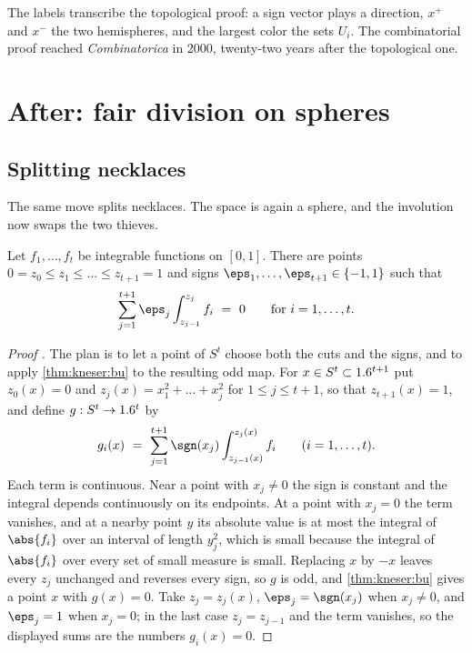 \begin{refsection}
The labels transcribe the topological proof: a sign vector plays a direction, $x^+$ and $x^-$ the two hemispheres, and the largest color the sets $U_i$. The combinatorial proof reached \emph{Combinatorica} in 2000, twenty-two years after the topological one.

\section{After: fair division on spheres}\label{sec:kneser:after2}

\subsection{Splitting necklaces}

The same move splits necklaces. The space is again a sphere, and the involution now swaps the two thieves.

\begin{theorem}\label{thm:kneser:hobbyrice}
Let $f_1,\dots,f_t$ be integrable functions on $[0,1]$. There are points $0=z_0\le z_1\le\dots\le z_{t+1}=1$ and signs $\eps_1,\dots,\eps_{t+1}\in\{-1,1\}$ such that
\[
\sum_{j=1}^{t+1}\eps_j\int_{z_{j-1}}^{z_j}f_i\ =\ 0\qquad\text{for } i=1,\dots,t.
\]
\end{theorem}

\begin{proof}[Proof \parencite{Pinkus1976,AlonWest1986}]
The plan is to let a point of $S^t$ choose both the cuts and the signs, and to apply \cref{thm:kneser:bu} to the resulting odd map. For $x\in S^t\subset1.6^{t+1}$ put $z_0(x)=0$ and $z_j(x)=x_1^2+\dots+x_j^2$ for $1\le j\le t+1$, so that $z_{t+1}(x)=1$, and define $g:S^t\to1.6^t$ by
\[
g_i(x)\ =\ \sum_{j=1}^{t+1}\sgn(x_j)\int_{z_{j-1}(x)}^{z_j(x)}f_i \qquad (i=1,\dots,t).
\]
Each term is continuous. Near a point with $x_j\ne0$ the sign is constant and the integral depends continuously on its endpoints. At a point with $x_j=0$ the term vanishes, and at a nearby point $y$ its absolute value is at most the integral of $\abs{f_i}$ over an interval of length $y_j^2$, which is small because the integral of $\abs{f_i}$ over every set of small measure is small. Replacing $x$ by $-x$ leaves every $z_j$ unchanged and reverses every sign, so $g$ is odd, and \cref{thm:kneser:bu} gives a point $x$ with $g(x)=0$. Take $z_j=z_j(x)$, $\eps_j=\sgn(x_j)$ when $x_j\ne0$, and $\eps_j=1$ when $x_j=0$; in the last case $z_j=z_{j-1}$ and the term vanishes, so the displayed sums are the numbers $g_i(x)=0$.
\end{proof}


\end{refsection}
